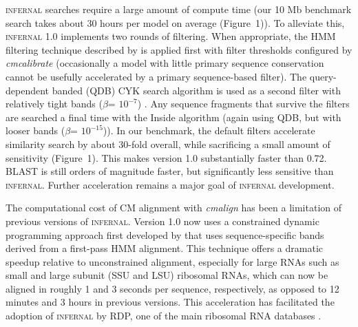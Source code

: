 \textsc{infernal} searches require a large amount of compute time (our
10 Mb benchmark search takes about 30 hours per model on average
(Figure~1)). To alleviate this, \textsc{infernal} 1.0 implements two
rounds of filtering.  When appropriate, the HMM filtering technique
described by \citet{WeinbergRuzzo06} is applied first with filter
thresholds configured by \emph{cmcalibrate} (occasionally a model with
little primary sequence conservation cannot be usefully accelerated by
a primary sequence-based filter).  The query-dependent banded (QDB)
CYK search algorithm is used as a second filter with relatively tight
bands ($\beta$= $10^{-7}$) \citep{NawrockiEddy07}.  Any sequence
fragments that survive the filters are searched a final time with the
Inside algorithm (again using QDB, but with looser bands ($\beta$=
$10^{-15}$)).  In our benchmark, the default filters accelerate
similarity search by about 30-fold overall, while sacrificing a small
amount of sensitivity (Figure~1). This makes version 1.0 substantially
faster than 0.72. \textsc{BLAST} is still orders of magnitude faster,
but significantly less sensitive than \textsc{infernal}. Further
acceleration remains a major goal of \textsc{infernal} development.

The computational cost of CM alignment with \emph{cmalign} has been a
limitation of previous versions of \textsc{infernal}. Version 1.0 now
uses a constrained dynamic programming approach first developed by
\citet{Brown00} that uses sequence-specific bands derived from a
first-pass HMM alignment. This technique offers a dramatic speedup
relative to unconstrained alignment, especially for large RNAs such as
small and large subunit (SSU and LSU) ribosomal RNAs, which can now be
aligned in roughly 1 and 3 seconds per sequence, respectively, as
opposed to 12 minutes and 3 hours in previous versions.  This
acceleration has facilitated the adoption of \textsc{infernal} by RDP,
one of the main ribosomal RNA databases \citep{Cole09}.


